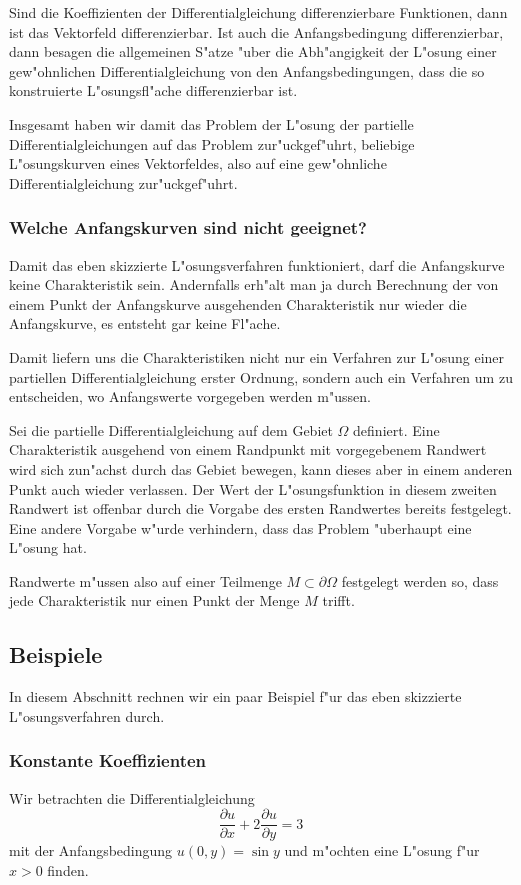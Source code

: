 Sind die Koeffizienten der Differentialgleichung differenzierbare Funktionen,
dann ist das Vektorfeld differenzierbar.
Ist auch die Anfangsbedingung differenzierbar,
dann besagen die allgemeinen S"atze "uber die Abh"angigkeit der L"osung einer
gew"ohnlichen Differentialgleichung von den Anfangsbedingungen, dass die so
konstruierte L"osungsfl"ache differenzierbar ist.

Insgesamt haben wir damit das Problem der L"osung der partielle Differentialgleichungen auf das Problem 
zur"uckgef"uhrt, beliebige L"osungskurven eines Vektorfeldes, also auf
eine gew"ohnliche Differentialgleichung zur"uckgef"uhrt.


\subsubsection{Welche Anfangskurven sind nicht geeignet?}
Damit das eben skizzierte L"osungsverfahren funktioniert, 
darf die Anfangskurve keine Charakteristik sein.
Andernfalls erh"alt man ja durch Berechnung der von einem Punkt
der Anfangskurve ausgehenden Charakteristik nur wieder die
Anfangskurve, es entsteht gar keine Fl"ache.

Damit liefern uns die Charakteristiken nicht nur ein Verfahren
zur L"osung einer partiellen Differentialgleichung erster Ordnung,
sondern auch ein Verfahren um zu entscheiden, wo Anfangswerte
vorgegeben werden m"ussen.

Sei die partielle Differentialgleichung auf dem Gebiet $\Omega$
definiert.
Eine Charakteristik ausgehend von einem Randpunkt mit vorgegebenem
Randwert wird sich zun"achst durch das Gebiet bewegen, kann dieses
aber in einem anderen Punkt auch wieder verlassen. Der Wert der
L"osungsfunktion in diesem zweiten Randwert ist offenbar durch die
Vorgabe des ersten Randwertes bereits festgelegt.
Eine andere Vorgabe w"urde verhindern, dass das Problem "uberhaupt
eine L"osung hat.

Randwerte m"ussen also auf einer Teilmenge $M\subset\partial \Omega$
festgelegt werden so, dass jede Charakteristik nur einen Punkt der
Menge $M$ trifft.

\subsection{Beispiele}
In diesem Abschnitt rechnen wir ein paar Beispiel f"ur das eben
skizzierte L"osungsverfahren durch.
\subsubsection{Konstante Koeffizienten\label{konstantekoeff}}
Wir betrachten die Differentialgleichung
\[
\frac{\partial u}{\partial x}+2\frac{\partial u}{\partial y}=3
\]
mit der Anfangsbedingung $u(0,y)=\sin y$ und m"ochten eine L"osung f"ur
$x>0$ finden.

